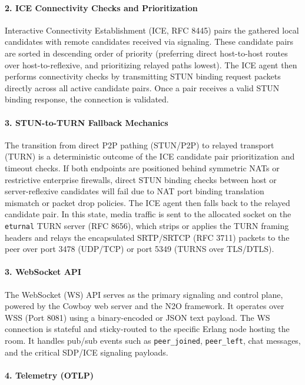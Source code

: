 \documentclass{article}
\begin{document}
\paragraph{2. ICE Connectivity Checks and Prioritization}

Interactive Connectivity Establishment (ICE, RFC 8445) pairs the gathered local candidates
with remote candidates received via signaling. These candidate pairs are sorted in descending
order of priority (preferring direct host-to-host routes over host-to-reflexive,
and prioritizing relayed paths lowest). The ICE agent then performs connectivity
checks by transmitting STUN binding request packets directly across all active
candidate pairs. Once a pair receives a valid STUN binding response, the connection is validated.

\paragraph{3. STUN-to-TURN Fallback Mechanics}

The transition from direct P2P pathing (STUN/P2P) to relayed transport (TURN) is a deterministic
outcome of the ICE candidate pair prioritization and timeout checks. If both endpoints are
positioned behind symmetric NATs or restrictive enterprise firewalls, direct STUN binding
checks between host or server-reflexive candidates will fail due to NAT port binding translation
mismatch or packet drop policies. The ICE agent then falls back to the relayed candidate pair.
In this state, media traffic is sent to the allocated socket on the \texttt{eturnal} TURN
server (RFC 8656), which strips or applies the TURN framing headers and relays the
encapsulated SRTP/SRTCP (RFC 3711) packets to the peer over port 3478 (UDP/TCP)
or port 5349 (TURNS over TLS/DTLS).

\paragraph{3. WebSocket API}

The WebSocket (WS) API serves as the primary signaling and control plane, powered by the
Cowboy web server and the N2O framework. It operates over WSS (Port 8081) using a binary-encoded
or JSON text payload. The WS connection is stateful and sticky-routed to the specific Erlang node
hosting the room. It handles pub/sub events such as \texttt{peer\_joined}, \texttt{peer\_left},
chat messages, and the critical SDP/ICE signaling payloads.

\paragraph{4. Telemetry (OTLP)}
\end{document}
